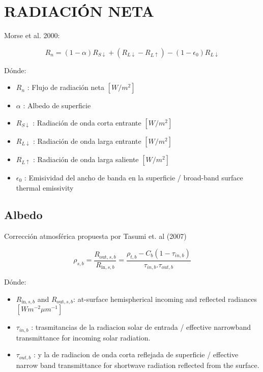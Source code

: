 \chapter{RADIACIÓN NETA} %

Morse et al. 2000:

\begin{equation}
R_n = (1- \alpha)R_{S\downarrow} + (R_{L\downarrow} - R_{L\uparrow}) - (1- \epsilon_0)R_{L\downarrow}
\label{eq:1}
\end{equation}

Dónde: 
\begin{itemize}
    \item $R_n$ : Flujo de radiación neta $[W/m^2]$
    \item $\alpha$ : Albedo de superficie
    \item $R_{S\downarrow}$ : Radiación de onda corta entrante $[W/m^2]$
    \item $R_{L\downarrow}$ : Radiación de onda larga entrante $[W/m^2]$
    \item $R_{L\uparrow}$ : Radiación de onda larga saliente $[W/m^2]$
    \item $\epsilon_0$ : Emisividad del ancho de banda en la superficie / broad-band surface thermal emissivity
\end{itemize}

\section{Albedo} %

Corrección atmosférica propuesta por Tasumi et. al (2007)

\begin{equation}
\rho_{s,b} = \frac{R_{\text{out},s,b}}{R_{\text{in},s,b}} = \frac{\rho_{t,b} - C_b(1-\tau_{in,b})}{\tau_{in,b}.\tau_{out,b}}
\label{eq:1}
\end{equation}

Dónde:
\begin{itemize}
    \item $R_{\text{in},s,b}$ and $R_{\text{out},s,b}$: at-surface  hemispherical incoming and reflected radiances $[W m^{-2} \mu m^{-1}]$
    \item $\tau_{in,b}$ : trasmitancias de la radiacion solar de entrada / effective narrowband transmittance for incoming solar radiation.
    \item $\tau_{out,b}$ : y la de radiacion de onda corta reflejada de superficie / effective narrow band transmittance for shortwave radiation reflected from the surface.
\end{itemize}

